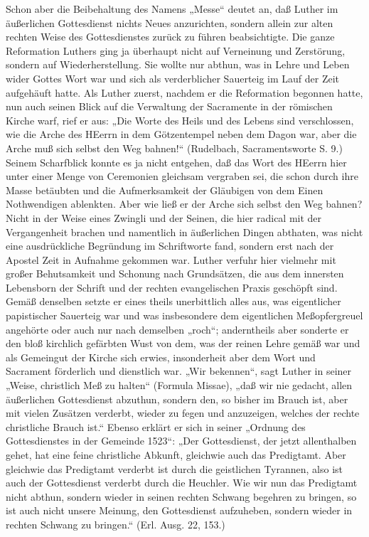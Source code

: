 Schon aber die Beibehaltung des Namens „Messe“ deutet an, daß Luther im äußerlichen Gottesdienst nichts Neues anzurichten, sondern allein zur alten rechten Weise des Gottesdienstes zurück zu führen beabsichtigte. Die ganze Reformation Luthers ging ja überhaupt nicht auf Verneinung und Zerstörung, sondern auf Wiederherstellung. Sie wollte nur abthun, was in Lehre und Leben wider Gottes Wort war und sich als verderblicher Sauerteig im Lauf der Zeit aufgehäuft hatte. Als Luther zuerst, nachdem er die Reformation begonnen hatte, nun auch seinen Blick auf die Verwaltung der Sacramente in der römischen Kirche warf, rief er aus: „Die Worte des Heils und des Lebens sind verschlossen, wie die Arche des HEerrn in dem Götzentempel neben dem Dagon war, aber die Arche muß sich selbst den Weg bahnen!“ (Rudelbach, Sacramentsworte S. 9.) Seinem Scharfblick konnte es ja nicht entgehen, daß das Wort des HEerrn hier unter einer Menge von Ceremonien gleichsam vergraben sei, die schon durch ihre Masse betäubten und die Aufmerksamkeit der Gläubigen von dem Einen Nothwendigen ablenkten. Aber wie ließ er der Arche sich selbst den Weg bahnen? Nicht in der Weise eines Zwingli und der Seinen, die hier radical mit der Vergangenheit brachen und namentlich in äußerlichen Dingen abthaten, was nicht eine ausdrückliche Begründung im Schriftworte fand, sondern erst nach der Apostel Zeit in Aufnahme gekommen war. Luther verfuhr hier vielmehr mit großer Behutsamkeit und Schonung nach Grundsätzen, die aus dem innersten Lebensborn der Schrift und der rechten evangelischen Praxis geschöpft sind. Gemäß denselben setzte er eines theils unerbittlich alles aus, was eigentlicher papistischer Sauerteig war und was insbesondere dem eigentlichen Meßopfergreuel
angehörte oder auch nur nach demselben „roch“; anderntheils aber sonderte er den bloß kirchlich gefärbten Wust von dem, was der reinen Lehre gemäß war und als Gemeingut der Kirche sich erwies, insonderheit aber dem Wort und Sacrament förderlich und dienstlich war. „Wir bekennen“, sagt Luther in seiner „Weise, christlich Meß zu halten“ (Formula Missae), „daß wir nie gedacht, allen äußerlichen Gottesdienst abzuthun, sondern den, so bisher im Brauch ist, aber mit vielen Zusätzen verderbt, wieder zu fegen und anzuzeigen, welches der rechte christliche Brauch ist.“ Ebenso erklärt er sich in seiner „Ordnung des Gottesdienstes in der Gemeinde 1523“: „Der Gottesdienst, der jetzt allenthalben gehet, hat eine feine christliche Abkunft, gleichwie auch das Predigtamt. Aber gleichwie das Predigtamt verderbt ist durch die geistlichen Tyrannen, also ist auch der Gottesdienst verderbt durch die Heuchler. Wie wir nun das Predigtamt nicht abthun, sondern wieder in seinen rechten Schwang begehren zu bringen, so ist auch nicht unsere Meinung, den Gottesdienst aufzuheben, sondern wieder in rechten Schwang zu bringen.“ (Erl. Ausg. 22, 153.)


